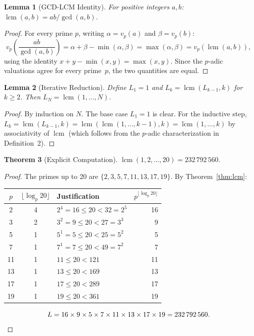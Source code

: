 \documentclass[11pt]{article}
\newtheorem{theorem}{Theorem}
\newtheorem{lemma}[theorem]{Lemma}
\begin{document}
\begin{lemma}[GCD-LCM Identity]\label{lem:gcdlcm}
For positive integers $a, b$: $\operatorname{lcm}(a,b) = ab / \gcd(a,b)$.
\end{lemma}

\begin{proof}
For every prime $p$, writing $\alpha = v_p(a)$ and $\beta = v_p(b)$:
\[
v_p\!\left(\frac{ab}{\gcd(a,b)}\right) = \alpha + \beta - \min(\alpha,\beta) = \max(\alpha,\beta) = v_p(\operatorname{lcm}(a,b)),
\]
using the identity $x + y - \min(x,y) = \max(x,y)$. Since the $p$-adic valuations agree for every prime~$p$, the two quantities are equal.
\end{proof}

\begin{lemma}[Iterative Reduction]\label{lem:iter}
Define $L_1 = 1$ and $L_k = \operatorname{lcm}(L_{k-1}, k)$ for $k \ge 2$. Then $L_N = \operatorname{lcm}(1, \ldots, N)$.
\end{lemma}

\begin{proof}
By induction on $N$. The base case $L_1 = 1$ is clear. For the inductive step, $L_k = \operatorname{lcm}(L_{k-1}, k) = \operatorname{lcm}(\operatorname{lcm}(1,\ldots,k-1), k) = \operatorname{lcm}(1, \ldots, k)$ by associativity of $\operatorname{lcm}$ (which follows from the $p$-adic characterization in Definition~2).
\end{proof}

\begin{theorem}[Explicit Computation]\label{thm:explicit}
$\operatorname{lcm}(1, 2, \ldots, 20) = 232\,792\,560$.
\end{theorem}

\begin{proof}
The primes up to 20 are $\{2, 3, 5, 7, 11, 13, 17, 19\}$. By Theorem~\ref{thm:lcm}:

\begin{center}
\begin{tabular}{ccl r}
\toprule
$p$ & $\lfloor \log_p 20 \rfloor$ & Justification & $p^{\lfloor \log_p 20 \rfloor}$ \\
\midrule
2  & 4 & $2^4 = 16 \le 20 < 32 = 2^5$ & 16 \\
3  & 2 & $3^2 = 9 \le 20 < 27 = 3^3$ & 9 \\
5  & 1 & $5^1 = 5 \le 20 < 25 = 5^2$ & 5 \\
7  & 1 & $7^1 = 7 \le 20 < 49 = 7^2$ & 7 \\
11 & 1 & $11 \le 20 < 121$ & 11 \\
13 & 1 & $13 \le 20 < 169$ & 13 \\
17 & 1 & $17 \le 20 < 289$ & 17 \\
19 & 1 & $19 \le 20 < 361$ & 19 \\
\bottomrule
\end{tabular}
\end{center}

\[
L = 16 \times 9 \times 5 \times 7 \times 11 \times 13 \times 17 \times 19 = 232\,792\,560. \qedhere
\]
\end{proof}
\end{document}
